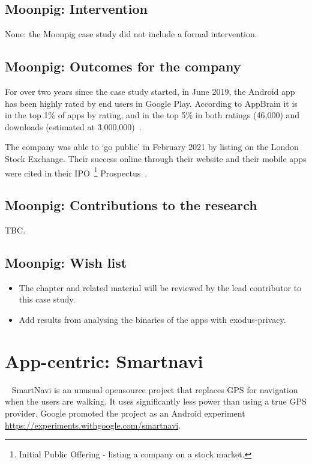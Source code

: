 \subsection{Moonpig: Intervention}
None: the Moonpig case study did not include a formal intervention.

\subsection{Moonpig: Outcomes for the company}
For over two years since the case study started, in June 2019, the Android app has been highly rated by end users in Google Play. According to AppBrain it is in the top 1\% of apps by rating, and in the top 5\% in both ratings (46,000) and downloads (estimated at 3,000,000)~\citep{appbrain_moonpig}.

The company was able to `go public' in February 2021 by listing on the London Stock Exchange.  Their success online through their website and their mobile apps were cited in their IPO~\footnote{Initial Public Offering - listing a company on a stock market.} Prospectus~\citep[p.92]{moonpig2021_ipo_prospectus}.

\subsection{Moonpig: Contributions to the research}
TBC.

\subsection*{Moonpig: Wish list}
{\small
\begin{itemize}
    \item The chapter and related material will be reviewed by the lead contributor to this case study.
    \item Add results from analysing the binaries of the apps with exodus-privacy.
\end{itemize}
}
\clearpage


\section{App-centric: Smartnavi}~\label{case-study-overview-smartnavi} 
SmartNavi is an unusual opensource project that replaces GPS for navigation when the users are walking. It uses significantly less power than using a true GPS provider. Google promoted the project as an Android experiment \url{https://experiments.withgoogle.com/smartnavi}.

